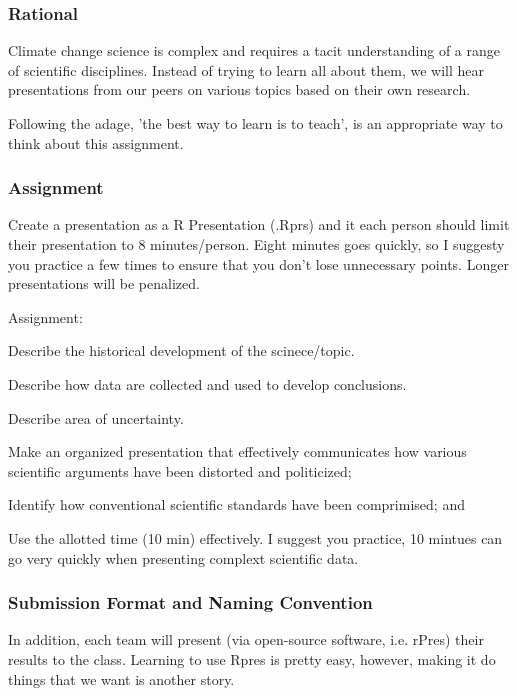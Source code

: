 
\subsubsection{Rational}

Climate change science is complex and requires a tacit understanding of a range of scientific disciplines. Instead of trying to learn all about them, we will hear presentations from our peers on various topics based on their own research. 

Following the adage, 'the best way to learn is to teach', is an appropriate way to think about this assignment. 

\subsubsection{Assignment}

Create a presentation as a R Presentation (.Rprs) and it each person should limit their presentation to 8 minutes/person. Eight minutes goes quickly, so I suggesty you practice a few times to ensure that you don't lose unnecessary points. Longer presentations will be penalized.  

\noindent Assignment: 
\begin{itemize*}
  \item Describe the historical development of the scinece/topic.
  \item Describe how data are collected and used to develop conclusions.
  \item Describe area of uncertainty.
  \item Make an organized presentation that effectively communicates how various scientific arguments have been distorted and politicized;
  \item Identify how conventional scientific standards have been comprimised; and
  \item Use the allotted time (10 min) effectively. I suggest you practice, 10 mintues can go very quickly when presenting complext scientific data.
\end{itemize*}

\subsubsection{Submission Format and Naming Convention}

In addition, each team will present (via open-source software, i.e. rPres) their results to the class. Learning to use Rpres is pretty easy, however, making it do things that we want is another story. 

